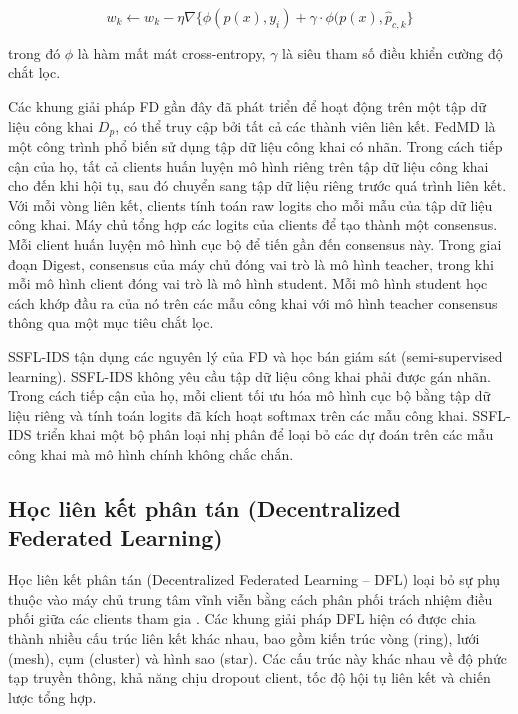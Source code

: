 \begin{equation}
\label{federateddistillation}
w_k \leftarrow w_k - \eta \nabla\{\phi(p(x),y_i) + \gamma \cdot \phi(p(x), \hat{p}_{c,k}\}
\end{equation}

trong đó $\phi$ là hàm mất mát cross-entropy, $\gamma$ là siêu tham số điều khiển cường độ chắt lọc.

Các khung giải pháp FD gần đây đã phát triển để hoạt động trên một tập dữ liệu công khai $D_p$, có thể truy cập bởi tất cả các thành viên liên kết. FedMD \cite{li2019fedmd} là một công trình phổ biến sử dụng tập dữ liệu công khai có nhãn. Trong cách tiếp cận của họ, tất cả clients huấn luyện mô hình riêng trên tập dữ liệu công khai cho đến khi hội tụ, sau đó chuyển sang tập dữ liệu riêng trước quá trình liên kết. Với mỗi vòng liên kết, clients tính toán raw logits cho mỗi mẫu của tập dữ liệu công khai. Máy chủ tổng hợp các logits của clients để tạo thành một consensus. Mỗi client huấn luyện mô hình cục bộ để tiến gần đến consensus này. Trong giai đoạn Digest, consensus của máy chủ đóng vai trò là mô hình teacher, trong khi mỗi mô hình client đóng vai trò là mô hình student. Mỗi mô hình student học cách khớp đầu ra của nó trên các mẫu công khai với mô hình teacher consensus thông qua một mục tiêu chắt lọc.

SSFL-IDS \cite{zhao2022ssfl} tận dụng các nguyên lý của FD và học bán giám sát (semi-supervised learning). SSFL-IDS không yêu cầu tập dữ liệu công khai phải được gán nhãn. Trong cách tiếp cận của họ, mỗi client tối ưu hóa mô hình cục bộ bằng tập dữ liệu riêng và tính toán logits đã kích hoạt softmax trên các mẫu công khai. SSFL-IDS triển khai một bộ phân loại nhị phân để loại bỏ các dự đoán trên các mẫu công khai mà mô hình chính không chắc chắn.

\subsection{Học liên kết phân tán (Decentralized Federated Learning)}
\label{sec:dfl}
Học liên kết phân tán (Decentralized Federated Learning -- DFL) loại bỏ sự phụ thuộc vào máy chủ trung tâm vĩnh viễn bằng cách phân phối trách nhiệm điều phối giữa các clients tham gia \cite{beltran2023dflsurvey}. Các khung giải pháp DFL hiện có được chia thành nhiều cấu trúc liên kết khác nhau, bao gồm kiến trúc vòng (ring), lưới (mesh), cụm (cluster) và hình sao (star). Các cấu trúc này khác nhau về độ phức tạp truyền thông, khả năng chịu dropout client, tốc độ hội tụ liên kết và chiến lược tổng hợp.

